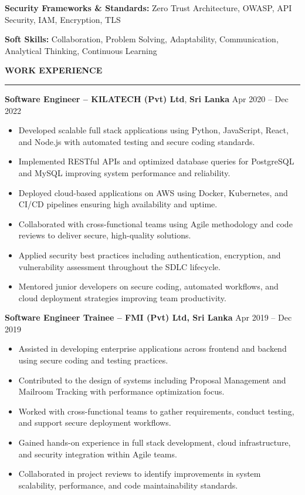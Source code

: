 \documentclass[10pt,letterpaper]{article}
\begin{document}
\textbf{Security Frameworks \& Standards:} Zero Trust Architecture, OWASP, API Security, IAM, Encryption, TLS

\textbf{Soft Skills:} Collaboration, Problem Solving, Adaptability, Communication, Analytical Thinking, Continuous Learning

\vspace{8pt}

\textbf{WORK EXPERIENCE}\\[-8pt]
\noindent\rule{\textwidth}{1pt}

\vspace{-2pt}

\textbf{Software Engineer -- KILATECH (Pvt) Ltd}, \textbf{Sri Lanka} \hfill Apr 2020 -- Dec 2022

\vspace{-1pt}

\begin{itemize}
\item Developed scalable full stack applications using Python, JavaScript, React, and Node.js with automated testing and secure coding standards.
\item Implemented RESTful APIs and optimized database queries for PostgreSQL and MySQL improving system performance and reliability.
\item Deployed cloud-based applications on AWS using Docker, Kubernetes, and CI/CD pipelines ensuring high availability and uptime.
\item Collaborated with cross-functional teams using Agile methodology and code reviews to deliver secure, high-quality solutions.
\item Applied security best practices including authentication, encryption, and vulnerability assessment throughout the SDLC lifecycle.
\item Mentored junior developers on secure coding, automated workflows, and cloud deployment strategies improving team productivity.
\end{itemize}

\textbf{Software Engineer Trainee -- FMI (Pvt) Ltd, Sri Lanka} \hfill Apr 2019 -- Dec 2019

\vspace{-1pt}

\begin{itemize}
\item Assisted in developing enterprise applications across frontend and backend using secure coding and testing practices.
\item Contributed to the design of systems including Proposal Management and Mailroom Tracking with performance optimization focus.
\item Worked with cross-functional teams to gather requirements, conduct testing, and support secure deployment workflows.
\item Gained hands-on experience in full stack development, cloud infrastructure, and security integration within Agile teams.
\item Collaborated in project reviews to identify improvements in system scalability, performance, and code maintainability standards.
\end{itemize}
\end{document}

